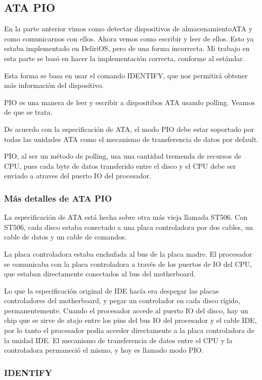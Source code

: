 \subsection{ATA PIO}
En la parte anterior vimos como detectar dispositivos de almacenamientoATA y como comunicarnos con ellos. Ahora vemos como escribir y leer de ellos. Esto ya estaba implementado en DeliriOS, pero de una forma incorrecta. Mi trabajo en esta parte se basó en hacer la implementación correcta, conforme al estándar.

Esta forma se basa en usar el comando IDENTIFY, que nos permitirá obtener más información del dispositivo.


PIO es una manera de leer y escribir a dispositibos ATA usando polling. Veamos de que se trata.

De acuerdo con la especificación de ATA, el modo PIO debe estar soportado por todas las unidades ATA como el mecanismo de transferencia de datos por default.

PIO, al ser un método de polling, usa una cantidad tremenda de recursos de CPU, pues cada byte de datos transferido entre el disco y el CPU debe ser enviado a atraves del puerto IO del procesador. 

\subsubsection{Más detalles de ATA PIO}

La especificación de ATA está hecha sobre otra más vieja llamada ST506. Con ST506, cada disco estaba conectado a una placa controladora por dos cables, un cable de datos y un cable de comandos.

La placa controladora estaba enchufada al bus de la placa madre. El procesador se comunicaba con la placa controladora a través de los puertos de IO del CPU, que estaban directamente conectados al bus del motherboard.

Lo que la especificación original de IDE hacía era despegar las placas controladores del motherboard, y pegar un controlador en cada disco rígido, permanentemente. Cuando el procesador accede al puerto IO del disco, hay un chip que se sirve de atajo entre los pins del bus IO del procesador y el cable IDE, por lo tanto el procesador podía acceder directamente a la placa controladora de la unidad IDE. El mecanismo de transferencia de datos entre el CPU y la controladora permaneció el mismo, y hoy es llamado modo PIO. 

\subsubsection{IDENTIFY}

